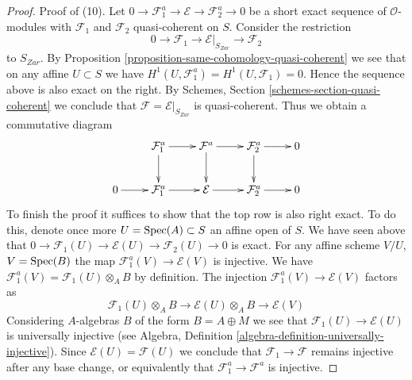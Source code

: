 \begin{proof}
\medskip\noindent
Proof of (10).
Let $0 \to \mathcal{F}_1^a \to \mathcal{E} \to \mathcal{F}_2^a \to 0$
be a short exact sequence of $\mathcal{O}$-modules with $\mathcal{F}_1$
and $\mathcal{F}_2$ quasi-coherent on $S$. Consider the restriction
$$
0 \to \mathcal{F}_1 \to \mathcal{E}|_{S_{Zar}} \to \mathcal{F}_2
$$
to $S_{Zar}$. By
Proposition \ref{proposition-same-cohomology-quasi-coherent}
we see that on any affine $U \subset S$ we have
$H^1(U, \mathcal{F}_1^a) = H^1(U, \mathcal{F}_1) = 0$.
Hence the sequence above is also exact on the right. By
Schemes, Section \ref{schemes-section-quasi-coherent}
we conclude that $\mathcal{F} = \mathcal{E}|_{S_{Zar}}$ is
quasi-coherent. Thus we obtain a commutative diagram
$$
\xymatrix{
& \mathcal{F}_1^a \ar[r] \ar[d] &
\mathcal{F}^a \ar[r] \ar[d] &
\mathcal{F}_2^a \ar[r] \ar[d] & 0 \\
0 \ar[r] &
\mathcal{F}_1^a \ar[r] &
\mathcal{E} \ar[r] &
\mathcal{F}_2^a \ar[r] & 0
}
$$
To finish the proof it suffices to show that the top row is also
right exact. To do this, denote once more $U = \mathop{\mathrm{Spec}}(A) \subset S$
an affine open of $S$. We have seen above that
$0 \to \mathcal{F}_1(U) \to \mathcal{E}(U) \to \mathcal{F}_2(U) \to 0$
is exact. For any affine scheme $V/U$,
$V = \mathop{\mathrm{Spec}}(B)$ the map $\mathcal{F}_1^a(V) \to \mathcal{E}(V)$
is injective. We have $\mathcal{F}_1^a(V) = \mathcal{F}_1(U) \otimes_A B$
by definition. The injection
$\mathcal{F}_1^a(V) \to \mathcal{E}(V)$ factors as
$$
\mathcal{F}_1(U) \otimes_A B \to
\mathcal{E}(U) \otimes_A B \to \mathcal{E}(V)
$$
Considering $A$-algebras $B$ of the form $B = A \oplus M$
we see that $\mathcal{F}_1(U) \to \mathcal{E}(U)$ is
universally injective (see
Algebra, Definition \ref{algebra-definition-universally-injective}).
Since $\mathcal{E}(U) = \mathcal{F}(U)$ we conclude that
$\mathcal{F}_1 \to \mathcal{F}$ remains injective after any base change,
or equivalently that $\mathcal{F}_1^a \to \mathcal{F}^a$ is injective.
\end{proof}


